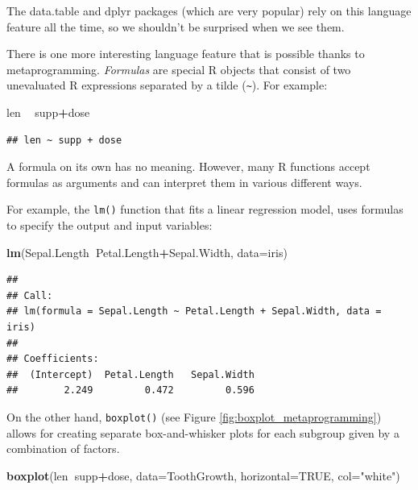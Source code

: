 \documentclass[10pt,b5paper,krantz1]{krantz}
\newenvironment{Shaded}{\begin{snugshade}}{\end{snugshade}}
\newcommand{\DataTypeTok}[1]{\textcolor[rgb]{0.27,0.27,0.27}{#1}}
\newcommand{\KeywordTok}[1]{\textcolor[rgb]{0.27,0.27,0.27}{\textbf{#1}}}
\newcommand{\NormalTok}[1]{#1}
\newcommand{\OperatorTok}[1]{\textcolor[rgb]{0.43,0.43,0.43}{\textbf{#1}}}
\newcommand{\OtherTok}[1]{\textcolor[rgb]{0.37,0.37,0.37}{#1}}
\newcommand{\StringTok}[1]{\textcolor[rgb]{0.5,0.5,0.5}{#1}}
\begin{document}
The data.table and dplyr packages (which are very popular)
rely on this language feature
all the time, so we shouldn't be surprised when we see them.

\bigskip

There is one more interesting language feature that is possible
thanks to metaprogramming.
\emph{Formulas} are special R objects that consist of two unevaluated
R expressions separated by a tilde (\texttt{\textasciitilde{}}).
For example:

\begin{Shaded}
\begin{Highlighting}[]
\NormalTok{len }\OperatorTok{~}\StringTok{ }\NormalTok{supp}\OperatorTok{+}\NormalTok{dose}
\end{Highlighting}
\end{Shaded}

\begin{verbatim}
## len ~ supp + dose
\end{verbatim}

A formula on its own has no meaning. However, many R functions
accept formulas as arguments and can interpret them in various different ways.

For example, the \texttt{lm()} function that fits a linear regression model,
uses formulas to specify the output and input variables:

\begin{Shaded}
\begin{Highlighting}[]
\KeywordTok{lm}\NormalTok{(Sepal.Length}\OperatorTok{~}\NormalTok{Petal.Length}\OperatorTok{+}\NormalTok{Sepal.Width, }\DataTypeTok{data=}\NormalTok{iris)}
\end{Highlighting}
\end{Shaded}

\begin{verbatim}
## 
## Call:
## lm(formula = Sepal.Length ~ Petal.Length + Sepal.Width, data = iris)
## 
## Coefficients:
##  (Intercept)  Petal.Length   Sepal.Width  
##        2.249         0.472         0.596
\end{verbatim}

On the other hand, \texttt{boxplot()} (see Figure \ref{fig:boxplot_metaprogramming})
allows for creating
separate box-and-whisker plots for each subgroup given by a combination
of factors.

\begin{Shaded}
\begin{Highlighting}[]
\KeywordTok{boxplot}\NormalTok{(len}\OperatorTok{~}\NormalTok{supp}\OperatorTok{+}\NormalTok{dose, }\DataTypeTok{data=}\NormalTok{ToothGrowth,}
    \DataTypeTok{horizontal=}\OtherTok{TRUE}\NormalTok{, }\DataTypeTok{col=}\StringTok{"white"}\NormalTok{)}
\end{Highlighting}
\end{Shaded}
\end{document}
